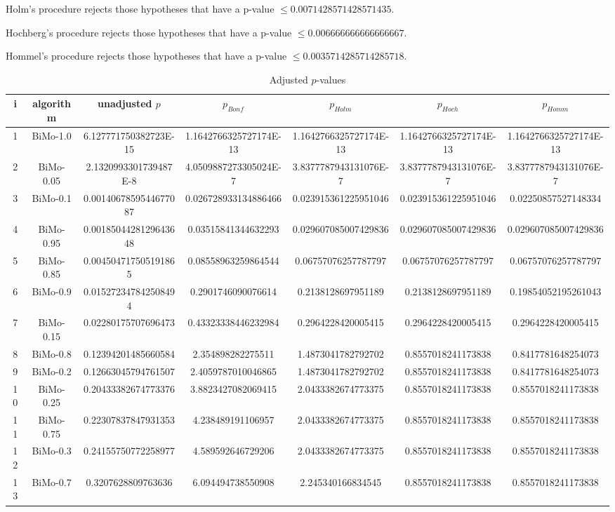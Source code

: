 \documentclass[a4paper,10pt]{article}
\begin{document}
\begin{landscape}
Holm's procedure rejects those hypotheses that have a p-value $\le0.0071428571428571435$.


Hochberg's procedure rejects those hypotheses that have a p-value $\le0.006666666666666667$.


Hommel's procedure rejects those hypotheses that have a p-value $\le0.0035714285714285718$.


\begin{table}[!htp]
\centering\tiny
\caption{Adjusted $p$-values}
\begin{tabular}{ccccccc}
i&algorithm&unadjusted $p$&$p_{Bonf}$&$p_{Holm}$&$p_{Hoch}$&$p_{Homm}$\\
\hline
1&BiMo-1.0&6.127771750382723E-15&1.1642766325727174E-13&1.1642766325727174E-13&1.1642766325727174E-13&1.1642766325727174E-13\\
2&BiMo-0.05&2.1320993301739487E-8&4.0509887273305024E-7&3.8377787943131076E-7&3.8377787943131076E-7&3.8377787943131076E-7\\
3&BiMo-0.1&0.0014067859544677087&0.026728933134886466&0.023915361225951046&0.023915361225951046&0.02250857527148334\\
4&BiMo-0.95&0.0018504428129643648&0.03515841344632293&0.029607085007429836&0.029607085007429836&0.029607085007429836\\
5&BiMo-0.85&0.004504717505191865&0.08558963259864544&0.06757076257787797&0.06757076257787797&0.06757076257787797\\
6&BiMo-0.9&0.015272347842508494&0.2901746090076614&0.2138128697951189&0.2138128697951189&0.19854052195261043\\
7&BiMo-0.15&0.02280175707696473&0.43323338446232984&0.2964228420005415&0.2964228420005415&0.2964228420005415\\
8&BiMo-0.8&0.12394201485660584&2.354898282275511&1.4873041782792702&0.8557018241173838&0.8417781648254073\\
9&BiMo-0.2&0.12663045794761507&2.4059787010046865&1.4873041782792702&0.8557018241173838&0.8417781648254073\\
10&BiMo-0.25&0.20433382674773376&3.8823427082069415&2.0433382674773375&0.8557018241173838&0.8557018241173838\\
11&BiMo-0.75&0.22307837847931353&4.238489191106957&2.0433382674773375&0.8557018241173838&0.8557018241173838\\
12&BiMo-0.3&0.24155750772258977&4.589592646729206&2.0433382674773375&0.8557018241173838&0.8557018241173838\\
13&BiMo-0.7&0.3207628809763636&6.094494738550908&2.245340166834545&0.8557018241173838&0.8557018241173838\\

\end{tabular}
\end{table}
\end{landscape}
\end{document}
